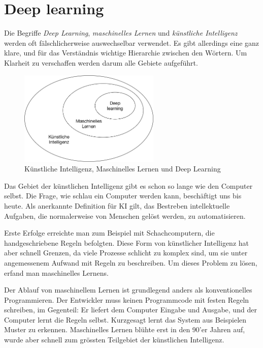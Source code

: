 \section{Deep learning}
Die Begriffe \textit{Deep Learning}, \textit{maschinelles Lernen} und \textit{künstliche Intelligenz} werden oft fälschlicherweise auswechselbar verwendet. Es gibt allerdings eine ganz klare, und für das Verständnis wichtige Hierarchie zwischen den Wörtern. Um Klarheit zu verschaffen werden darum alle Gebiete aufgeführt.

\begin{figure}[hbt]
	\centering
		\includegraphics[width=0.6\textwidth]{assets/hierarchy.png}
	\caption{Künstliche Intelligenz, Maschinelles Lernen und Deep Learning}
	\label{img:hierarchy}
\end{figure}

Das Gebiet der künstlichen Intelligenz gibt es schon so lange wie den Computer selbst. Die Frage, wie schlau ein Computer werden kann, beschäftigt uns bis heute. Als anerkannte Definition für KI gilt, das Bestreben intellektuelle Aufgaben, die normalerweise von Menschen gelöst werden, zu automatisieren.

Erste Erfolge erreichte man zum Beispiel mit Schachcomputern, die handgeschriebene Regeln befolgten. Diese Form von künstlicher Intelligenz hat aber schnell Grenzen, da viele Prozesse schlicht zu komplex sind, um sie unter angemessenem Aufwand mit Regeln zu beschreiben. Um dieses Problem zu lösen, erfand man maschinelles Lernens. 

Der Ablauf von maschinellem Lernen ist grundlegend anders als konventionelles Programmieren. Der Entwickler muss  keinen Programmcode mit festen Regeln schreiben, im Gegenteil: Er liefert dem Computer Eingabe und Ausgabe, und der Computer lernt die Regeln selbst. Kurzgesagt lernt das System aus Beispielen Muster zu erkennen. Maschinelles Lernen blühte erst in den 90'er Jahren auf, wurde aber schnell zum grössten Teilgebiet der künstlichen Intelligenz.

